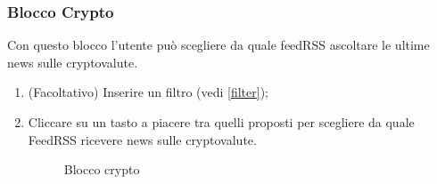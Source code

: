 \subsubsection{Blocco Crypto}
Con questo blocco l'utente può scegliere da quale feedRSS ascoltare le ultime news sulle cryptovalute.
\begin{enumerate}
	\item (Facoltativo) Inserire un filtro (vedi \ref{filter});
	\item Cliccare su un tasto a piacere tra quelli proposti per scegliere da quale FeedRSS ricevere news sulle cryptovalute.
\begin{figure}[!ht]
	\centering
	\caption{Blocco crypto}
\end{figure}
\end{enumerate}
\newpage
